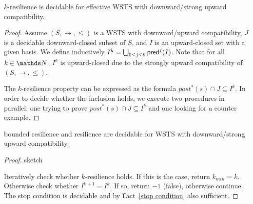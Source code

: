 \begin{theorem}
{\sc $k$-resilience} is decidable for effective WSTS with downward/strong upward compatibility.
\end{theorem}
\begin{proof}

Assume  $(S, \rightarrow, \leq)$ is a WSTS with downward/upward compatibility, $J$ is a decidable downward-closed subset of $S$, and $I$ is an upward-closed set with a given basis.
We define inductively
$I^{k} = \bigcup_{0 \leq j \leq k} \textsf{pred}^j(I)$. Note that for all $k \in \N$, $I^k$ is upward-closed due to
the strongly upward compatibility of $(S, \rightarrow, \leq)$.


The $k$-resilience property can be expressed as the formula
$ post^*(s) \cap J \subseteq I^k$. In order to decide whether the inclusion holds, we execute two procedures in parallel, one trying to prove $ post^*(s)\cap J \subseteq I^k$ 
and one looking for a counter example.

\end{proof}


\begin{corollary}
{\sc bounded resilience} and {\sc resilience} are decidable for WSTS with downward/strong upward compatibility.
\end{corollary}

\begin{proof}{sketch}

Iteratively check whether $k$-resilience holds. 
If this is the case, return $k_{min} = k$. Otherwise check whether 
$I^{k+1} = I^k$. If so, return $-1$ (false), otherwise
continue.
The stop condition is decidable
and by Fact~\ref{stop condition} also sufficient. 
\end{proof}

%
%


